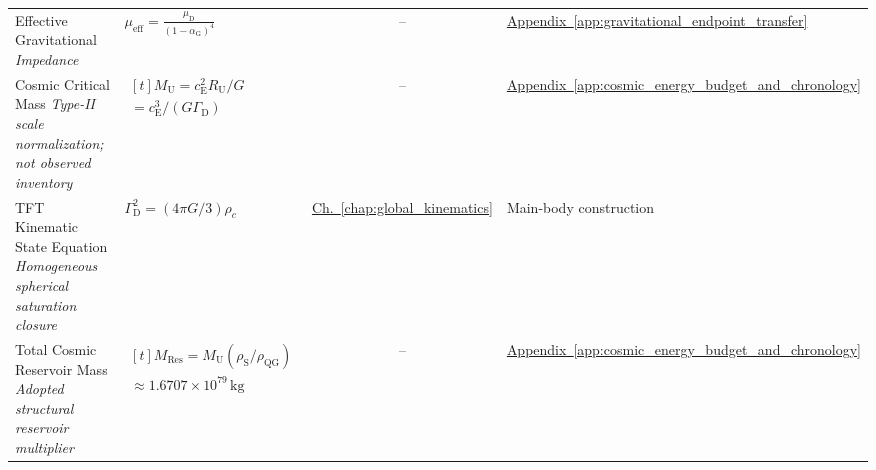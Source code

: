 \begin{longtable}{@{} p{4.5cm} p{6cm} c p{4cm} @{}}
{\raggedright Effective Gravitational \newline \textit{Impedance}\par} & {\raggedright $\mu_{\mathrm{eff}} = \frac{\mu_{\mathrm{D}}}{(1-\alpha_{\mathrm{G}})^4}$\par} & -- & {\raggedright \hyperref[app:gravitational_endpoint_transfer]{Appendix~\ref*{app:gravitational_endpoint_transfer}}\par} \\

{\raggedright Cosmic Critical Mass \newline \textit{Type-II scale normalization; not observed inventory}\par} & {\raggedright $\begin{gathered}[t]M_{\mathrm U}=c_{\mathrm E}^2R_{\mathrm U}/G \\ =c_{\mathrm E}^3/(G\Gamma_{\mathrm D})\end{gathered}$\par} & -- & {\raggedright \hyperref[app:cosmic_energy_budget_and_chronology]{Appendix~\ref*{app:cosmic_energy_budget_and_chronology}}\par} \\

{\raggedright TFT Kinematic State Equation \newline \textit{Homogeneous spherical saturation closure}\par} & {\raggedright $\Gamma_{\mathrm D}^2=(4\pi G/3)\rho_c$\par} & \hyperref[chap:global_kinematics]{Ch.~\ref*{chap:global_kinematics}} & {\raggedright Main-body construction\par} \\

{\raggedright Total Cosmic Reservoir Mass \newline \textit{Adopted structural reservoir multiplier}\par} & {\raggedright $\begin{gathered}[t]M_{\mathrm{Res}}=M_{\mathrm U}(\rho_{\mathrm S}/\rho_{\mathrm{QG}}) \\ \approx1.6707\times10^{79}\,\mathrm{kg}\end{gathered}$\par} & -- & {\raggedright \hyperref[app:cosmic_energy_budget_and_chronology]{Appendix~\ref*{app:cosmic_energy_budget_and_chronology}}\par} \\


\end{longtable}
